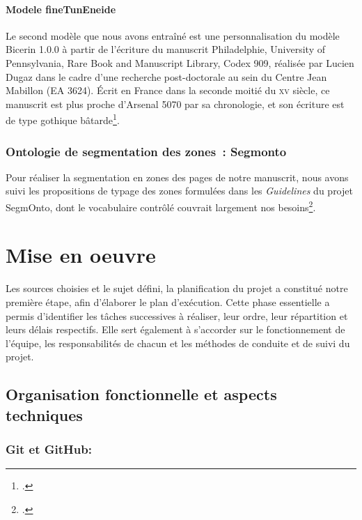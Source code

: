 \documentclass{article}
\newcommand{\siecle}[1]{\textsc{#1}\ieme}
\begin{document}
	\paragraph{Modele fineTunEneide}
	Le second modèle que nous avons entraîné est une personnalisation du modèle Bicerin 1.0.0 à partir de l'écriture du manuscrit Philadelphie, University of Pennsylvania, Rare Book and Manuscript Library, Codex 909, réalisée par Lucien Dugaz dans le cadre d'une recherche post-doctorale au sein du Centre Jean Mabillon (EA 3624). Écrit en France dans la seconde moitié du \siecle{xv} siècle, ce manuscrit est plus proche d'Arsenal 5070 par sa chronologie, et son écriture est de type gothique bâtarde\footcite{dugazEditionCritiqueNumerique2021, pennlibrariesMedievalRenaissanceManuscripts}.
	
	\subsubsection{Ontologie de segmentation des zones~: Segmonto}
	Pour réaliser la segmentation en zones des pages de notre manuscrit, nous avons suivi les propositions de typage des zones formulées dans les \textit{Guidelines} du projet SegmOnto, dont le vocabulaire contrôlé couvrait largement nos besoins\footcite{campsSegmOntoGuidelines2021}.
	
	\section{Mise en oeuvre}
	Les sources choisies et le sujet défini, la planification du projet a constitué notre première étape, afin d’élaborer le plan d'exécution. Cette phase essentielle a permis d'identifier les tâches successives à réaliser, leur ordre, leur répartition et leurs délais respectifs. Elle sert également à s’accorder sur le fonctionnement de l’équipe, les responsabilités de chacun et les méthodes de conduite et de suivi du projet.
	\subsection{Organisation fonctionnelle et aspects techniques}
	
	\subsubsection{Git et GitHub:}
	
\end{document}
